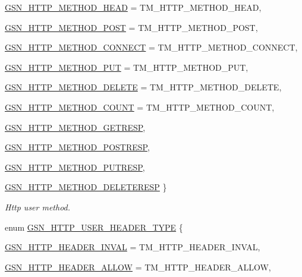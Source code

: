 \begin{DoxyCompactItemize}
\hyperlink{a00665_gga23245efd9f2c5fead55d4b1f075bd6bfaed6349d77721f0a2def48104a9b2e126}{GSN\_\-HTTP\_\-METHOD\_\-HEAD} =  TM\_\-HTTP\_\-METHOD\_\-HEAD, 
\par
\hyperlink{a00665_gga23245efd9f2c5fead55d4b1f075bd6bfafe5aa62ce75366be5c4fff7fa6f41692}{GSN\_\-HTTP\_\-METHOD\_\-POST} =  TM\_\-HTTP\_\-METHOD\_\-POST, 
\par
\hyperlink{a00665_gga23245efd9f2c5fead55d4b1f075bd6bfa49471c632c648bd36514d1aca91d6c1b}{GSN\_\-HTTP\_\-METHOD\_\-CONNECT} =  TM\_\-HTTP\_\-METHOD\_\-CONNECT, 
\par
\hyperlink{a00665_gga23245efd9f2c5fead55d4b1f075bd6bfa3186edc861824d93546e002761b4f8a5}{GSN\_\-HTTP\_\-METHOD\_\-PUT} =  TM\_\-HTTP\_\-METHOD\_\-PUT, 
\par
\hyperlink{a00665_gga23245efd9f2c5fead55d4b1f075bd6bfa7206136b25faed7aa7a4b858c422fda4}{GSN\_\-HTTP\_\-METHOD\_\-DELETE} =  TM\_\-HTTP\_\-METHOD\_\-DELETE, 
\par
\hyperlink{a00665_gga23245efd9f2c5fead55d4b1f075bd6bfac3fddab110406469374570885eca7e6c}{GSN\_\-HTTP\_\-METHOD\_\-COUNT} =  TM\_\-HTTP\_\-METHOD\_\-COUNT, 
\par
\hyperlink{a00665_gga23245efd9f2c5fead55d4b1f075bd6bfa905b4fed44395aff4dd725dfae44b4a6}{GSN\_\-HTTP\_\-METHOD\_\-GETRESP}, 
\par
\hyperlink{a00665_gga23245efd9f2c5fead55d4b1f075bd6bfab8e063b00065703cbb762ac8e3368cf7}{GSN\_\-HTTP\_\-METHOD\_\-POSTRESP}, 
\par
\hyperlink{a00665_gga23245efd9f2c5fead55d4b1f075bd6bfa60ce87d9a4055e7ca2f270c284887772}{GSN\_\-HTTP\_\-METHOD\_\-PUTRESP}, 
\par
\hyperlink{a00665_gga23245efd9f2c5fead55d4b1f075bd6bfa7a79063e9170111025817a4be8b1ce82}{GSN\_\-HTTP\_\-METHOD\_\-DELETERESP}
 \}
\begin{DoxyCompactList}\small\item\em Http user method. \end{DoxyCompactList}\item 
enum \hyperlink{a00665_ga46b2de5d0afbd35d93a0426f601866d9}{GSN\_\-HTTP\_\-USER\_\-HEADER\_\-TYPE} \{ \par
\hyperlink{a00665_gga46b2de5d0afbd35d93a0426f601866d9ab68113bc844e4b59876e58347aaa94ad}{GSN\_\-HTTP\_\-HEADER\_\-INVAL} =  TM\_\-HTTP\_\-HEADER\_\-INVAL, 
\par
\hyperlink{a00665_gga46b2de5d0afbd35d93a0426f601866d9ae759d9154bcb437a72cfd523760fc09c}{GSN\_\-HTTP\_\-HEADER\_\-ALLOW} =  TM\_\-HTTP\_\-HEADER\_\-ALLOW, 
\par

\end{DoxyCompactItemize}
